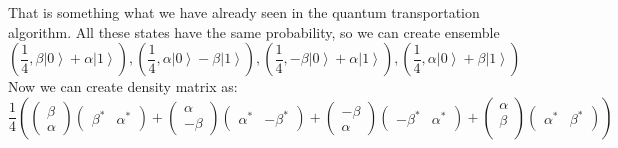 \documentclass[a4paper,10pt]{article}
\newcommand{\ket}[1]{\ensuremath{\left|#1\right\rangle}} %
\begin{document}
\begin{enumerate}[1.]
That is something what we have already seen in the quantum transportation algorithm.
All these states have the same probability, so we can create ensemble
$$
{(\frac{1}{4},\beta\ket{0} + \alpha\ket{1}),
 (\frac{1}{4},\alpha\ket{0} - \beta\ket{1}),
 (\frac{1}{4},-\beta\ket{0} + \alpha\ket{1}),
 (\frac{1}{4},\alpha\ket{0} + \beta\ket{1})}
$$
Now we can create density matrix as:
$$
\frac{1}{4}\left(
\left(
\begin{array}{c}
\beta\\
\alpha
\end{array}
\right)
\left(
\begin{array}{cc}
\beta^* & \alpha^*
\end{array}
\right)
+
\left(
\begin{array}{c}
\alpha\\
-\beta
\end{array}
\right)
\left(
\begin{array}{cc}
 \alpha^*& -\beta^*
\end{array}
\right)
+
\left(
\begin{array}{c}
-\beta\\
\alpha
\end{array}
\right)
\left(
\begin{array}{cc}
-\beta^* & \alpha^*
\end{array}
\right)
+
\left(
\begin{array}{c}
\alpha\\
\beta\\
\end{array}
\right)
\left(
\begin{array}{cc}
\alpha^* & \beta^*
\end{array}
\right)
\right)
$$


\end{enumerate}
\end{document}
